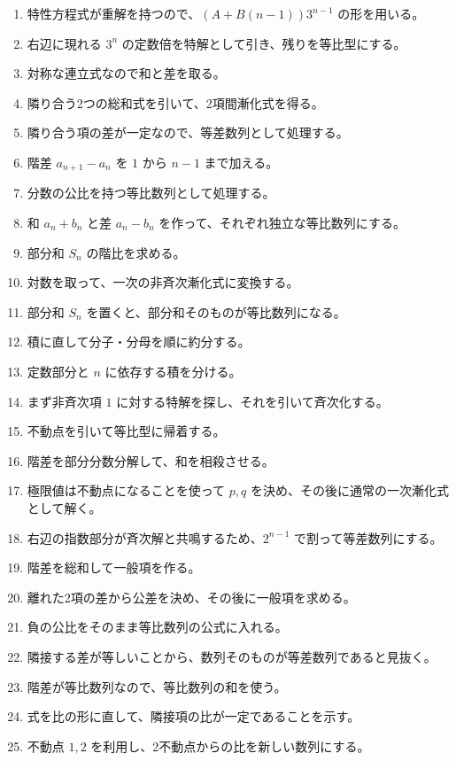 \begin{enumerate}[label=\textbf{問\arabic*.},leftmargin=3.8em,format=\bookitemlink{practice-basic}{hint}{problem}]
        \item 特性方程式が重解を持つので、\((A+B(n-1))3^{n-1}\) の形を用いる。
        \item 右辺に現れる \(3^n\) の定数倍を特解として引き、残りを等比型にする。
        \item 対称な連立式なので和と差を取る。
        \item 隣り合う2つの総和式を引いて、2項間漸化式を得る。
        \item 隣り合う項の差が一定なので、等差数列として処理する。
        \item 階差 \(a_{n+1}-a_n\) を \(1\) から \(n-1\) まで加える。
        \item 分数の公比を持つ等比数列として処理する。
        \item 和 \(a_n+b_n\) と差 \(a_n-b_n\) を作って、それぞれ独立な等比数列にする。
        \item 部分和 \(S_n\) の階比を求める。
        \item 対数を取って、一次の非斉次漸化式に変換する。
        \item 部分和 \(S_n\) を置くと、部分和そのものが等比数列になる。
        \item 積に直して分子・分母を順に約分する。
        \item 定数部分と \(n\) に依存する積を分ける。
        \item まず非斉次項 \(1\) に対する特解を探し、それを引いて斉次化する。
        \item 不動点を引いて等比型に帰着する。
        \item 階差を部分分数分解して、和を相殺させる。
        \item 極限値は不動点になることを使って \(p,q\) を決め、その後に通常の一次漸化式として解く。
        \item 右辺の指数部分が斉次解と共鳴するため、\(2^{n-1}\) で割って等差数列にする。
        \item 階差を総和して一般項を作る。
        \item 離れた2項の差から公差を決め、その後に一般項を求める。
        \item 負の公比をそのまま等比数列の公式に入れる。
        \item 隣接する差が等しいことから、数列そのものが等差数列であると見抜く。
        \item 階差が等比数列なので、等比数列の和を使う。
        \item 式を比の形に直して、隣接項の比が一定であることを示す。
        \item 不動点 \(1,2\) を利用し、2不動点からの比を新しい数列にする。

\end{enumerate}
